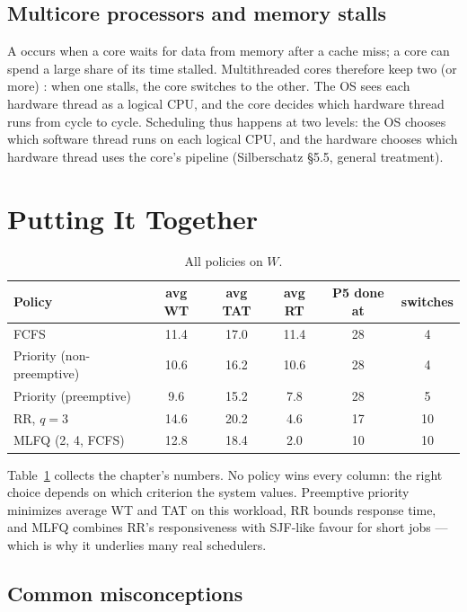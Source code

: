 \documentclass[11pt]{article}
\begin{document}
\subsection*{Multicore processors and memory stalls}

A  occurs when a core waits for data from memory after a cache miss; a core can spend a large share of its time stalled. Multithreaded cores therefore keep two (or more) : when one stalls, the core switches to the other. The OS sees each hardware thread as a logical CPU, and the core decides which hardware thread runs from cycle to cycle. Scheduling thus happens at two levels: the OS chooses which software thread runs on each logical CPU, and the hardware chooses which hardware thread uses the core's pipeline (Silberschatz \S5.5, general treatment).

\section{Putting It Together}

\begin{table}[h]
\centering
\renewcommand{\arraystretch}{1.15}
\begin{tabular}{lccccc}
  \textbf{Policy} & \textbf{avg WT} & \textbf{avg TAT} & \textbf{avg RT} & \textbf{P5 done at} & \textbf{switches} \\ \hline
  FCFS & 11.4 & 17.0 & 11.4 & 28 & 4 \\
  Priority (non-preemptive) & 10.6 & 16.2 & 10.6 & 28 & 4 \\
  Priority (preemptive) & 9.6 & 15.2 & 7.8 & 28 & 5 \\
  RR, $q=3$ & 14.6 & 20.2 & 4.6 & 17 & 10 \\
  MLFQ (2, 4, FCFS) & 12.8 & 18.4 & 2.0 & 10 & 10 \\
\end{tabular}
\caption{All policies on $W$.}
\label{tab:all}
\end{table}

Table~\ref{tab:all} collects the chapter's numbers. No policy wins every column: the right choice depends on which criterion the system values. Preemptive priority minimizes average WT and TAT on this workload, RR bounds response time, and MLFQ combines RR's responsiveness with SJF-like favour for short jobs --- which is why it underlies many real schedulers.

\subsection*{Common misconceptions}
\end{document}
